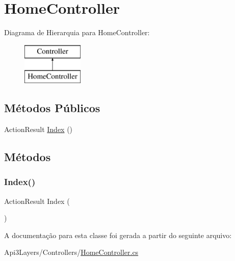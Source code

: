 \hypertarget{classApi3Layers_1_1Controllers_1_1HomeController}{}\section{Home\+Controller}
\label{classApi3Layers_1_1Controllers_1_1HomeController}
Diagrama de Hierarquia para Home\+Controller\+:\begin{figure}[H]
\begin{center}
\leavevmode
\includegraphics[height=2.000000cm]{classApi3Layers_1_1Controllers_1_1HomeController}
\end{center}
\end{figure}
\subsection*{Métodos Públicos}
\begin{DoxyCompactItemize}
\item 
Action\+Result \hyperlink{classApi3Layers_1_1Controllers_1_1HomeController_a82bdd581a9c68d02c11ac8160aa5d60b}{Index} ()
\end{DoxyCompactItemize}


\subsection{Métodos}
\mbox{\label{classApi3Layers_1_1Controllers_1_1HomeController_a82bdd581a9c68d02c11ac8160aa5d60b}} 
\subsubsection{\texorpdfstring{Index()}{Index()}}
{\footnotesize\ttfamily Action\+Result Index (\begin{DoxyParamCaption}{ }\end{DoxyParamCaption})}



A documentação para esta classe foi gerada a partir do seguinte arquivo\+:\begin{DoxyCompactItemize}
\item 
Api3\+Layers/\+Controllers/\hyperlink{HomeController_8cs}{Home\+Controller.\+cs}\end{DoxyCompactItemize}
